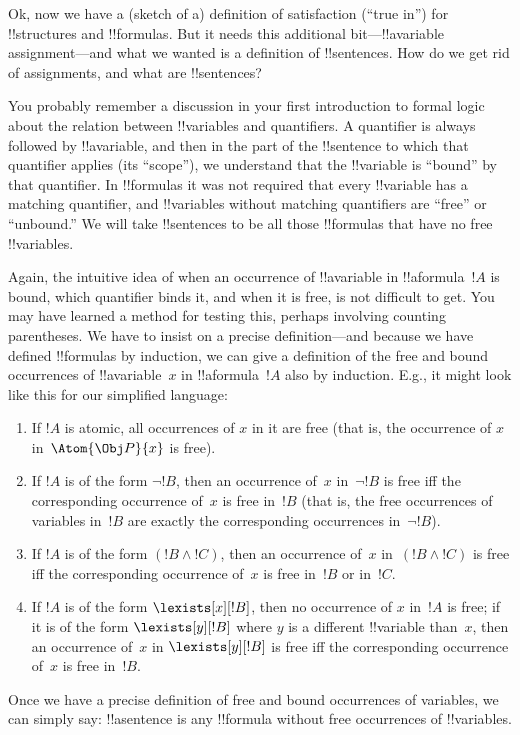 \documentclass[../../../include/open-logic-section]{subfiles}
\begin{document}

Ok, now we have a (sketch of a) definition of satisfaction (``true
in'') for !!{structure}s and !!{formula}s. But it needs this
additional bit---!!a{variable} assignment---and what we wanted is a
definition of !!{sentence}s. How do we get rid of assignments, and
what are !!{sentence}s?

You probably remember a discussion in your first introduction to
formal logic about the relation between !!{variable}s and quantifiers.
A quantifier is always followed by !!a{variable}, and then in the part
of the !!{sentence} to which that quantifier applies (its ``scope''),
we understand that the !!{variable} is ``bound'' by that quantifier.
In !!{formula}s it was not required that every !!{variable} has a
matching quantifier, and !!{variable}s without matching quantifiers
are ``free'' or ``unbound.''  We will take !!{sentence}s to be all
those !!{formula}s that have no free !!{variable}s.

Again, the intuitive idea of when an occurrence of !!a{variable} in
!!a{formula}~$!A$ is bound, which quantifier binds it, and when it is
free, is not difficult to get. You may have learned a method for
testing this, perhaps involving counting parentheses.  We have to
insist on a precise definition---and because we have defined
!!{formula}s by induction, we can give a definition of the free and
bound occurrences of !!a{variable}~$x$ in !!a{formula}~$!A$ also by
induction.  E.g., it might look like this for our simplified language:
\begin{enumerate}
  \item If $!A$ is atomic, all occurrences of $x$ in it are free (that
  is, the occurrence of $x$ in~$\Atom{\Obj P}{x}$ is free).
  \item If $!A$ is of the form $\lnot !B$, then an occurrence of~$x$
  in~$\lnot !B$ is free iff the corresponding occurrence of~$x$ is
  free in~$!B$ (that is, the free occurrences of variables in~$
  !B$ are exactly the corresponding occurrences in~$\lnot !B$).
  \item If $!A$ is of the form $(!B \land !C)$, then an occurrence of~$x$
  in~$(!B \land !C)$ is free iff the corresponding occurrence of~$x$ is
  free in~$!B$ or in~$!C$.
  \item If $!A$ is of the form $\lexists[x][!B]$, then no occurrence
  of $x$ in~$!A$ is free; if it is of the form $\lexists[y][!B]$ where
  $y$ is a different !!{variable} than~$x$, then an occurrence of~$x$
  in $\lexists[y][!B]$ is free iff the corresponding occurrence of~$x$
  is free in~$!B$.
\end{enumerate}

Once we have a precise definition of free and bound occurrences of
variables, we can simply say: !!a{sentence} is any !!{formula} without
free occurrences of !!{variable}s.
\end{document}
